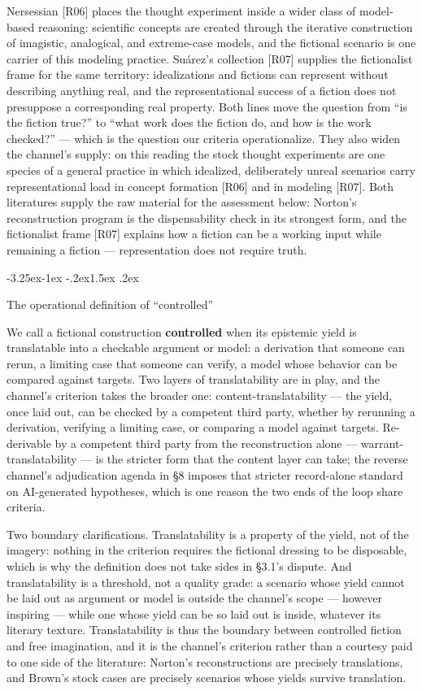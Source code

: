 \documentclass[11pt,a4paper]{article}
\makeatletter
\renewcommand\subsection{\@startsection{subsection}{2}{\z@}%
  {-3.25ex\@plus -1ex \@minus -.2ex}{1.5ex \@plus .2ex}%
  {\normalfont\large\bfseries\raggedright}}
\makeatother
\begin{document}
Nersessian [R06] places the thought experiment inside a wider class of model-based reasoning: scientific concepts are created through the iterative construction of imagistic, analogical, and extreme-case models, and the fictional scenario is one carrier of this modeling practice. Suárez's collection [R07] supplies the fictionalist frame for the same territory: idealizations and fictions can represent without describing anything real, and the representational success of a fiction does not presuppose a corresponding real property. Both lines move the question from ``is the fiction true?'' to ``what work does the fiction do, and how is the work checked?'' — which is the question our criteria operationalize. They also widen the channel's supply: on this reading the stock thought experiments are one species of a general practice in which idealized, deliberately unreal scenarios carry representational load in concept formation [R06] and in modeling [R07]. Both literatures supply the raw material for the assessment below: Norton's reconstruction program is the dispensability check in its strongest form, and the fictionalist frame [R07] explains how a fiction can be a working input while remaining a fiction — representation does not require truth.

\subsection{The operational definition of ``controlled''}

We call a fictional construction \textbf{controlled} when its epistemic yield is translatable into a checkable argument or model: a derivation that someone can rerun, a limiting case that someone can verify, a model whose behavior can be compared against targets. Two layers of translatability are in play, and the channel's criterion takes the broader one: content-translatability — the yield, once laid out, can be checked by a competent third party, whether by rerunning a derivation, verifying a limiting case, or comparing a model against targets. Re-derivable by a competent third party from the reconstruction alone — warrant-translatability — is the stricter form that the content layer can take; the reverse channel's adjudication agenda in §8 imposes that stricter record-alone standard on AI-generated hypotheses, which is one reason the two ends of the loop share criteria.

Two boundary clarifications. Translatability is a property of the yield, not of the imagery: nothing in the criterion requires the fictional dressing to be disposable, which is why the definition does not take sides in §3.1's dispute. And translatability is a threshold, not a quality grade: a scenario whose yield cannot be laid out as argument or model is outside the channel's scope — however inspiring — while one whose yield can be so laid out is inside, whatever its literary texture. Translatability is thus the boundary between controlled fiction and free imagination, and it is the channel's criterion rather than a courtesy paid to one side of the literature: Norton's reconstructions are precisely translations, and Brown's stock cases are precisely scenarios whose yields survive translation.
\end{document}
